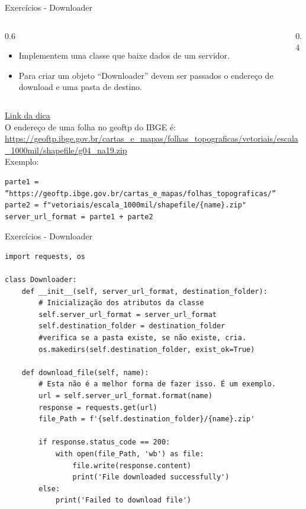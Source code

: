 \documentclass{beamer}
\begin{document}
\begin{frame}[fragile]{Exercícios - Downloader}
  \begin{columns}[t]
    \begin{column}[t]{0.6\textwidth}
        \begin{itemize}
          \item Implementem uma classe que baixe dados de um servidor.
          \item Para criar um objeto “Downloader” devem ser passados o endereço de download e uma pasta de destino. 
        \end{itemize}
    \end{column}
    
    \begin{column}[t]{0.4\textwidth}

    \end{column}
  \end{columns}
    \href{https://www.geeksforgeeks.org/how-to-download-files-from-urls-with-python/}{Link da dica}\\
    O endereço de uma folha no geoftp do IBGE é: \\
    \url{https://geoftp.ibge.gov.br/cartas_e_mapas/folhas_topograficas/vetoriais/escala_1000mil/shapefile/g04_na19.zip} \\
    Exemplo:
    
    \begin{verbatim}
parte1 = ”https://geoftp.ibge.gov.br/cartas_e_mapas/folhas_topograficas/”
parte2 = f"vetoriais/escala_1000mil/shapefile/{name}.zip"
server_url_format = parte1 + parte2
    \end{verbatim}
    
\end{frame}

\begin{frame}[fragile]{Exercícios - Downloader}
    \begin{verbatim}
import requests, os 

class Downloader:
    def __init__(self, server_url_format, destination_folder):
        # Inicialização dos atributos da classe
        self.server_url_format = server_url_format
        self.destination_folder = destination_folder
        #verifica se a pasta existe, se não existe, cria.
        os.makedirs(self.destination_folder, exist_ok=True)

    def download_file(self, name):
        # Esta não é a melhor forma de fazer isso. É um exemplo.
        url = self.server_url_format.format(name)
        response = requests.get(url)
        file_Path = f'{self.destination_folder}/{name}.zip'
    
        if response.status_code == 200:
            with open(file_Path, 'wb') as file:
                file.write(response.content)
                print('File downloaded successfully')
        else:
            print('Failed to download file')
    \end{verbatim}

\end{frame}
\end{document}
